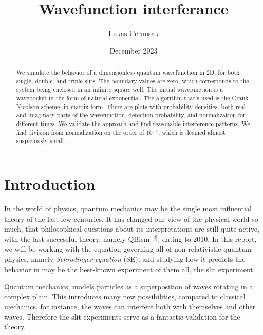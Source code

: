 \documentclass[english,notitlepage,reprint,nofootinbib]{revtex4-1}  %
\begin{document}
\title{Wavefunction interferance}  %
\author{Lukas Cernusak} %
\date{December 2023}                             %
\noaffiliation                            %




\begin{abstract}
We simulate the behavior of a dimensionless quantum wavefunction in 2D, for both single, double, and triple slits. The boundary values are zero, which corresponds to the system being enclosed in an infinite square well. The initial wavefunction is a wavepocket in the form of natural exponential. The algorithm that's used is the Crank-Nicolson scheme, in matrix form. There are plots with probability densities, both real and imaginary parts of the wavefunction, detection probability, and normalization for different times. We validate the approach and find reasonable interference patterns. We find division from normalization on the order of $10^{-7}$, which is deemed almost suspiciously small. 
\end{abstract}
\maketitle



\section{Introduction}
In the world of physics, quantum mechanics may be the single most influential theory of the last few centuries. It has changed our view of the physical world so much, that philosophical questions about its interpretations are still quite active, with the last successful theory, namely QBism $^{\text{[2]}}$, dating to 2010. In this report, we will be working with the equation governing all of non-relativistic quantum physics, namely \textit{Schrodinger equation} (SE), and studying how it predicts the behavior in may be the best-known experiment of them all, the slit experiment.

Quantum mechanics, models particles as a superposition of waves rotating in a complex plain. This introduces many new possibilities, compared to classical mechanics, for instance, the waves can interfere both with themselves and other waves. Therefore the slit experiments serve as a fantastic validation for the theory.
\end{document}
